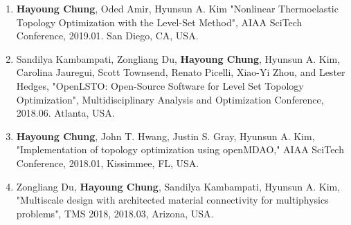 \documentclass[margin, 10pt]{res} %
\begin{document}
\begin{resume}
\begin{enumerate}
    \item \textbf{Hayoung Chung}, Oded Amir, Hyunsun A. Kim "Nonlinear Thermoelastic Topology Optimization with the Level-Set Method", AIAA SciTech Conference, 2019.01. San Diego, CA, USA.
    \item Sandilya Kambampati, Zongliang Du, \textbf{Hayoung Chung}, Hyunsun A. Kim, Carolina Jauregui, Scott Townsend, Renato Picelli, Xiao-Yi Zhou, and Lester Hedges, "OpenLSTO: Open-Source Software for Level Set Topology Optimization", Multidisciplinary Analysis and Optimization Conference, 2018.06. Atlanta, USA.
    \item \textbf{Hayoung Chung}, John T. Hwang, Justin S. Gray, Hyunsun A. Kim, "Implementation of topology optimization using openMDAO," AIAA SciTech Conference, 2018.01, Kissimmee, FL, USA.
    \item Zongliang Du, \textbf{Hayoung Chung}, Sandilya Kambampati, Hyunsun A. Kim, "Multiscale design with architected material connectivity for multiphysics problems", TMS 2018, 2018.03, Arizona, USA.
    

\end{enumerate}
\end{resume}
\end{document}
